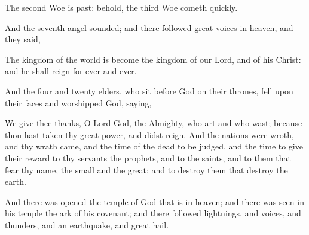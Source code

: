  The second Woe is past: behold, the third Woe cometh quickly.

 And the seventh angel sounded; and there followed great voices in heaven, and they said,

The kingdom of the world is become the kingdom of our Lord, and of his Christ: and he shall reign for ever and ever.

 And the four and twenty elders, who sit before God on their thrones, fell upon their faces and worshipped God, 
 saying,

We give thee thanks, O Lord God, the Almighty, who art and who wast; because thou hast taken thy great power, and didst reign. 
 And the nations were wroth, and thy wrath came, and the time of the dead to be judged, and the time to give their reward to thy servants the prophets, and to the saints, and to them that fear thy name, the small and the great; and to destroy them that destroy the earth.

 And there was opened the temple of God that is in heaven; and there was seen in his temple the ark of his covenant; and there followed lightnings, and voices, and thunders, and an earthquake, and great hail.